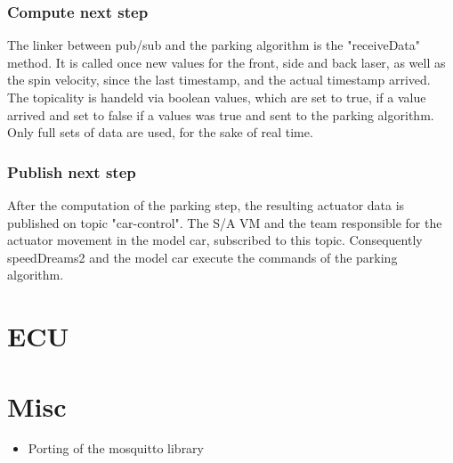 \documentclass[paper=a4, fontsize=11pt]{scrreprt}
\begin{document}
  \subsection{Compute next step}
The linker between pub/sub and the parking algorithm is the "receiveData" method. It is called once new values for the front, side and back laser, as well as the spin velocity, since the last timestamp, and the actual timestamp arrived. The topicality is handeld via boolean values, which are set to true, if a value arrived and set to false if a values was true and sent to the parking algorithm. Only full sets of data are used, for the sake of real time.
  \subsection{Publish next step}
After the computation of the parking step, the resulting actuator data is published on topic "car-control". The S/A VM and the team responsible for the actuator movement in the model car, subscribed to this topic. Consequently speedDreams2 and the model car execute the commands of the parking algorithm.
\chapter{ECU}
\chapter{Misc}
\begin{itemize}
  \item Porting of the mosquitto library %
\end{itemize}


\end{document}
